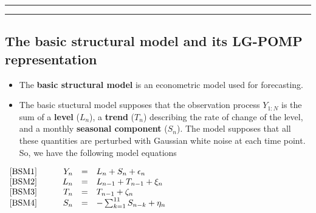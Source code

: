 \documentclass[]{article}
\begin{document}
\begin{center}\rule{0.5\linewidth}{\linethickness}\end{center}

\begin{center}\rule{0.5\linewidth}{\linethickness}\end{center}

\subsection{The basic structural model and its LG-POMP
representation}\label{the-basic-structural-model-and-its-lg-pomp-representation}

\begin{itemize}
\item
  The \textbf{basic structural model} is an econometric model used for
  forecasting.
\item
  The basic stuctural model supposes that the observation process
  \(Y_{1:N}\) is the sum of a \textbf{level} (\(L_n\)), a \textbf{trend}
  (\(T_n\)) describing the rate of change of the level, and a monthly
  \textbf{seasonal component} (\(S_n\)). The model supposes that all
  these quantities are perturbed with Gaussian white noise at each time
  point. So, we have the following model equations
\end{itemize}

\(\begin{array}{lrcl} \mbox{[BSM1]} \quad\quad & Y_n &=& L_n + S_n + \epsilon_n \\ \mbox{[BSM2]} \quad\quad & L_{n} &=& L_{n-1} + T_{n-1} + \xi_n \\ \mbox{[BSM3]} \quad\quad & T_{n} &=& T_{n-1} + \zeta_n \\ \mbox{[BSM4]} \quad\quad & S_{n} &=& -\sum_{k=1}^{11} S_{n-k} + \eta_n \end{array}\)
\end{document}
